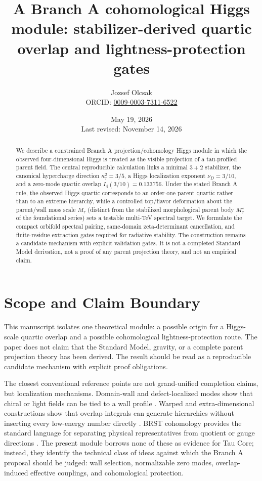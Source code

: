 \documentclass[11pt]{article}
\title{A Branch A cohomological Higgs module: stabilizer-derived quartic overlap and lightness-protection gates}
\author{Jozsef Olcsak\\{\small ORCID: \href{https://orcid.org/0009-0003-7311-6522}{0009-0003-7311-6522}}}
\date{May 19, 2026\\Last revised: November 14, 2026}
\begin{document}
\maketitle

\begin{abstract}
We describe a constrained Branch A projection/cohomology Higgs module in which
the observed four-dimensional Higgs is treated as the visible projection of a
tau-profiled parent field. The central reproducible calculation links a
minimal $3+2$ stabilizer, the canonical hypercharge direction
$\kappa_\tau^2=3/5$, a Higgs localization exponent $\nu_D=3/10$, and a
zero-mode quartic overlap $I_4(3/10)=0.133756$. Under the stated Branch A rule,
the observed Higgs quartic corresponds to an order-one parent quartic
rather than to an extreme hierarchy, while a controlled top/flavor deformation
about the parent/wall mass scale $M_\tau$ (distinct from the stabilized
morphological parent body $M_\tau^\star$ of the foundational series) sets a
testable multi-TeV spectral target. We formulate the compact orbifold spectral
pairing, same-domain zeta-determinant cancellation, and finite-residue
extraction gates required for radiative stability. The construction remains a
candidate mechanism with explicit validation gates. It is not a completed Standard Model derivation, not a proof
of any parent projection theory, and not an empirical claim.
\end{abstract}

\section{Scope and Claim Boundary}
This manuscript isolates one theoretical module: a possible origin for a Higgs-scale quartic overlap and a possible cohomological lightness-protection route. The paper does not claim that the Standard Model, gravity, or a complete parent projection theory has been derived. The result should be read as a reproducible candidate mechanism with explicit proof obligations.

The closest conventional reference points are not grand-unified completion
claims, but localization mechanisms.  Domain-wall and defect-localized modes
show that chiral or light fields can be tied to a wall profile
\cite{JackiwRebbi1976,Kaplan1992,RubakovShaposhnikov1983}.  Warped and
extra-dimensional constructions show that overlap integrals can generate
hierarchies without inserting every low-energy number directly
\cite{RandallSundrum1999}.  BRST cohomology provides the standard language
for separating physical representatives from quotient or gauge directions
\cite{Becchi1976,KugoOjima1979}.  The present module borrows none of these
as evidence for Tau Core; instead, they identify the technical class of ideas
against which the Branch A proposal should be judged: wall selection,
normalizable zero modes, overlap-induced effective couplings, and
cohomological protection.
\end{document}
